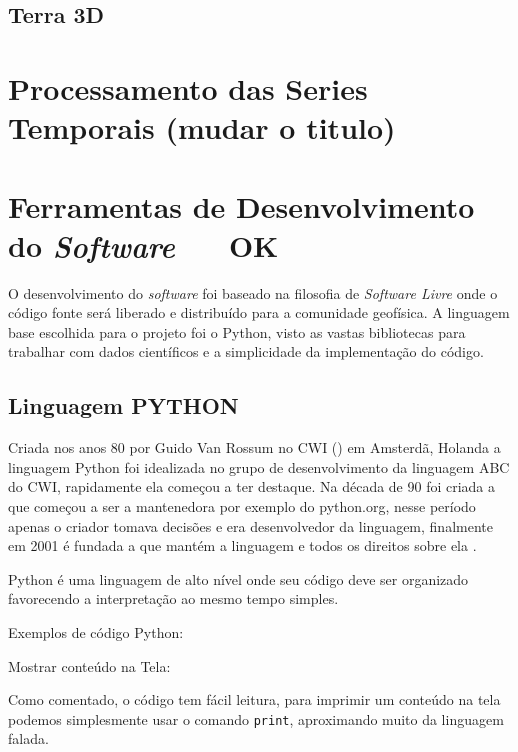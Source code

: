        
        \subsection{Terra 3D}
    
    \section{Processamento das Series Temporais (mudar o titulo)}
    
    \section{Ferramentas de Desenvolvimento do \textit{Software} \,\,\,\,\,\,\, OK}
    
        O desenvolvimento do \textit{software} foi baseado na filosofia de \textit{Software Livre} \cite{soft_free} onde o código fonte será liberado e distribuído para a comunidade geofísica. A linguagem base escolhida para o projeto foi o Python, visto as vastas bibliotecas para trabalhar com dados científicos e a simplicidade da implementação do código.  
        
        \subsection{Linguagem PYTHON}
            \label{lim_python}
            
            Criada nos anos 80 por Guido Van Rossum no CWI () em Amsterdã, Holanda a linguagem Python foi idealizada no grupo de desenvolvimento da linguagem ABC do CWI, rapidamente ela começou a ter destaque. Na década de 90 foi criada a  que começou a ser a mantenedora por exemplo do python.org, nesse período apenas o criador tomava decisões e era desenvolvedor da linguagem, finalmente em 2001 é fundada a  que mantém a linguagem e todos os direitos sobre ela \cite{python36}.  
            
            Python é uma linguagem de alto nível onde seu código deve ser organizado favorecendo a interpretação ao mesmo tempo simples.
            
            Exemplos de código Python:

            Mostrar conteúdo na Tela:
            
            Como comentado, o código tem fácil leitura, para imprimir um conteúdo na tela 
            podemos simplesmente usar o comando \verb|print|, aproximando muito da linguagem falada.  
            \begin{quote}
                                                       

            \end{quote}
            
